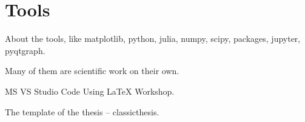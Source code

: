 \chapter{Tools}
\label{ch:tools_appendix}



About the tools, like matplotlib, python, julia, numpy, scipy, packages, jupyter, pyqtgraph.

Many of them are scientific work on their own.

MS VS Studio Code Using LaTeX Workshop.

The template of the thesis -- classicthesis.
